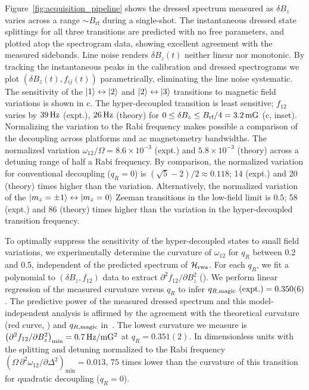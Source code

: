 \documentclass[aps,prl,reprint,superscriptaddress,floatfix]{revtex4-1}
\begin{document}
Figure~\ref{fig:acquisition_pipeline} shows the dressed spectrum measured as $\delta B_z$ varies across a range $\sim B_{\text{rf}}$ during a single-shot.
The instantaneous dressed state splittings for all three transitions are predicted with no free parameters, and plotted atop the spectrogram data, showing excellent agreement with the measured sidebands.
Line noise renders $\delta B_z(t)$ neither linear nor monotonic.
By tracking the instantaneous peaks in the calibration and dressed spectrograms we plot $(\delta B_z(t), f_{ij}(t))$ parametrically, eliminating the line noise systematic.
The sensitivity of the $\vert 1 \rangle  \leftrightarrow \vert 2 \rangle $ and $\vert 2 \rangle  \leftrightarrow \vert 3 \rangle $ transitions to magnetic field variations is shown in c.
The hyper-decoupled transition is least sensitive; $f_{12}$ varies by $\unit[39]{Hz}$ (expt.), $\unit[26]{Hz}$ (theory) for $0 \leq \delta B_z \leq B_{\text{rf}}/4 = \unit[3.2]{mG}$ (c, inset).
Normalizing the variation to the Rabi frequency makes possible a comparison of the decoupling across platforms and ac magnetometry bandwidths. 
The normalized variation $\omega_{12}/\Omega = 8.6\times10^{-3}$ (expt.) and $5.8\times10^{-3}$ (theory) across a detuning range of half a Rabi frequency.
By comparison, the normalized variation for conventional decoupling ($q_R=0$) is $(\sqrt{5}-2)/2 \approx 0.118$; 14 (expt.) and 20 (theory) times higher than the variation.
Alternatively, the normalized variation of the $\vert m_z=\pm1 \rangle  \leftrightarrow \vert m_z = 0 \rangle $ Zeeman transitions in the low-field limit is $0.5$; 58 (expt.) and 86 (theory) times higher than the variation in the hyper-decoupled transition frequency.

To optimally suppress the sensitivity of the hyper-decoupled states to small field variations, we experimentally determine the curvature of $\omega_{12}$  for $q_R$ between 0.2 and 0.5, independent of the predicted spectrum of $\mathcal{H}_{\text{rwa}}$.
For each $q_R$, we fit a polynomial to $(\delta B_z, f_{12})$ data to extract $\partial^2 f_{12}/\partial B_z^2$ ().
We perform linear regression of the measured curvature versus $q_R$ to infer $q_{R,\text{magic}}\text{ (expt.)} = 0.350(6)$.
The predictive power of the measured dressed spectrum and this model-independent analysis is affirmed by the agreement with the theoretical curvature (red curve, ) and $q_{R,\text{magic}}$ in~.
The lowest curvature we measure is $\left(\partial^2 f_{12}/\partial B_z^2\right)_{\text{min}} = \unit[0.7]{Hz/mG^2}$ at $q_R = 0.351(2)$.
In dimensionless units with the splitting and detuning normalized to the Rabi frequency $\left(\Omega\, \partial^2\omega_{12}/\partial \Delta^2\right)_{\text{min}} = 0.013$, $75$ times lower than the curvature of this transition for quadratic decoupling ($q_R = 0$).
\end{document}
